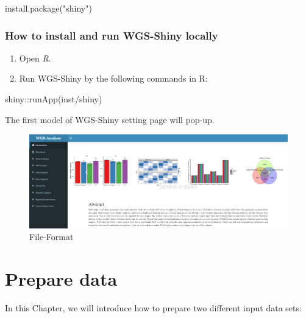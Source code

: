 \documentclass[
]{book}
\newenvironment{Shaded}{\begin{snugshade}}{\end{snugshade}}
\newcommand{\FunctionTok}[1]{\textcolor[rgb]{0.00,0.00,0.00}{#1}}
\newcommand{\NormalTok}[1]{#1}
\newcommand{\SpecialCharTok}[1]{\textcolor[rgb]{0.00,0.00,0.00}{#1}}
\newcommand{\StringTok}[1]{\textcolor[rgb]{0.31,0.60,0.02}{#1}}
\providecommand{\tightlist}{%
  \setlength{\itemsep}{0pt}\setlength{\parskip}{0pt}}
\theoremstyle{definition}
\theoremstyle{definition}
\theoremstyle{definition}
\theoremstyle{definition}
\theoremstyle{remark}
\begin{document}
\begin{Shaded}
\begin{Highlighting}[]
\FunctionTok{install.package}\NormalTok{(}\StringTok{"shiny"}\NormalTok{)}
\end{Highlighting}
\end{Shaded}

\hypertarget{how-to-install-and-run-wgs-shiny-locally}{%
\subsection{How to install and run WGS-Shiny locally}\label{how-to-install-and-run-wgs-shiny-locally}}

\begin{enumerate}
\def\labelenumi{\arabic{enumi}.}
\tightlist
\item
  Open \emph{R}.
\item
  Run WGS-Shiny by the following commands in R:
\end{enumerate}

\begin{Shaded}
\begin{Highlighting}[]
\NormalTok{shiny}\SpecialCharTok{::}\FunctionTok{runApp}\NormalTok{(}\StringTok{\textquotesingle{}inst/shiny\textquotesingle{}}\NormalTok{)}
\end{Highlighting}
\end{Shaded}

The first model of WGS-Shiny setting page will pop-up.

\begin{figure}
\includegraphics[width=0.8\linewidth]{figure/Main-page} \caption{File-Format}\label{fig:unnamed-chunk-3}
\end{figure}

\hypertarget{prepare-data}{%
\chapter{Prepare data}\label{prepare-data}}

In this Chapter, we will introduce how to prepare two different input data sets:
\end{document}
